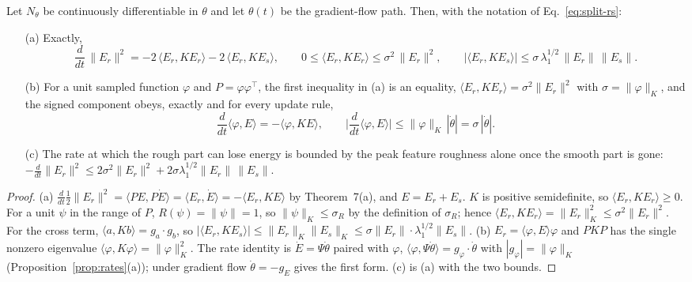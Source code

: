 \begin{proposition}
\label{prop:rough-energy}
Let $N_\theta$ be continuously differentiable in $\theta$ and let $\theta(t)$
be the gradient-flow path. Then, with the notation of
Eq.~\eqref{eq:split-rs}:
\begin{enumerate}
\item[(a)] Exactly,
\begin{equation}
\frac{d}{dt}\,\|E_r\|^2 = -2\,\langle E_r, K E_r\rangle - 2\,\langle E_r, K E_s\rangle,
\qquad
0 \le \langle E_r, K E_r\rangle \le \sigma^2\,\|E_r\|^2,
\qquad
|\langle E_r, K E_s\rangle| \le \sigma\,\lambda_1^{1/2}\,\|E_r\|\,\|E_s\|.
\label{eq:rough-rate}
\end{equation}
\item[(b)] For a unit sampled function $\varphi$ and $P=\varphi\varphi^{\!\top}$,
the first inequality in (a) is an equality,
$\langle E_r,KE_r\rangle=\sigma^2\|E_r\|^2$ with $\sigma=\|\varphi\|_K$, and
the signed component obeys, exactly and for every update rule,
\begin{equation}
\frac{d}{dt}\langle\varphi,E\rangle = -\langle\varphi,KE\rangle,\qquad
\Big|\frac{d}{dt}\langle\varphi,E\rangle\Big| \le \|\varphi\|_{K}\,|\dot\theta| = \sigma\,|\dot\theta| .
\label{eq:signed-rate}
\end{equation}
\item[(c)] The rate at which the rough part can lose energy is bounded by the
peak feature roughness alone once the smooth part is gone:
$-\frac{d}{dt}\|E_r\|^2 \le 2\sigma^2\|E_r\|^2 + 2\sigma\lambda_1^{1/2}\|E_r\|\,\|E_s\|$.
\end{enumerate}
\end{proposition}

\begin{proof}
(a) $\frac{d}{dt}\frac12\|E_r\|^2 = \langle PE, P\dot E\rangle = \langle E_r,\dot E\rangle = -\langle E_r, KE\rangle$
by Theorem~7(a), and $E = E_r+E_s$. $K$ is positive semidefinite, so
$\langle E_r,KE_r\rangle\ge0$. For a unit $\psi$ in the range of $P$,
$R(\psi)=\|\psi\|=1$, so $\|\psi\|_K\le\sigma_R$ by the definition of
$\sigma_R$; hence $\langle E_r,KE_r\rangle=\|E_r\|_K^2\le\sigma^2\|E_r\|^2$.
For the cross term, $\langle a,Kb\rangle = g_a\cdot g_b$, so
$|\langle E_r,KE_s\rangle|\le \|E_r\|_K\|E_s\|_K\le \sigma\|E_r\|\cdot\lambda_1^{1/2}\|E_s\|$.
(b) $E_r=\langle\varphi,E\rangle\varphi$ and $PKP$ has the single nonzero
eigenvalue $\langle\varphi,K\varphi\rangle=\|\varphi\|_K^2$. The rate identity
is $\dot E=\Psi\dot\theta$ paired with $\varphi$,
$\langle\varphi,\Psi\dot\theta\rangle=g_\varphi\cdot\dot\theta$ with
$|g_\varphi|=\|\varphi\|_K$ (Proposition~\ref{prop:rates}(a)); under gradient
flow $\dot\theta=-g_E$ gives the first form. (c) is (a) with the two bounds.
\end{proof}

